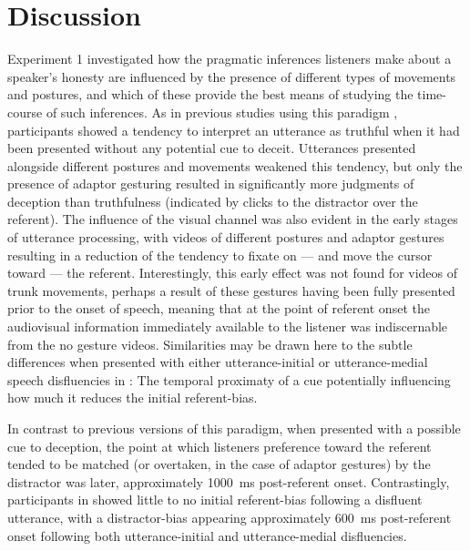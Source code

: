 \documentclass[a4paper,man,natbib]{apa6}
\begin{document}
\section{Discussion}
Experiment 1 investigated how the pragmatic inferences listeners make about a speaker's honesty are influenced by the presence of different types of movements and postures, and which of these provide the best means of studying the time-course of such inferences.
As in previous studies using this paradigm \citep{Loy2017, King2018}, participants showed a tendency to interpret an utterance as truthful when it had been presented without any potential cue to deceit.
Utterances presented alongside different postures and movements weakened this tendency, but only the presence of adaptor gesturing resulted in significantly more judgments of deception than truthfulness (indicated by clicks to the distractor over the referent).
The influence of the visual channel was also evident in the early stages of utterance processing, with videos of different postures and adaptor gestures resulting in a reduction of the tendency to fixate on --- and move the cursor toward --- the referent.
Interestingly, this early effect was not found for videos of trunk movements, perhaps a result of these gestures having been fully presented prior to the onset of speech, meaning that at the point of referent onset the audiovisual information immediately available to the listener was indiscernable from the no gesture videos. 
Similarities may be drawn here to the subtle differences when presented with either utterance-initial or utterance-medial speech disfluencies in \citet{Loy2017}: The temporal proximaty of a cue potentially influencing how much it reduces the initial referent-bias. 
 
In contrast to previous versions of this paradigm, when presented with a possible cue to deception, the point at which listeners preference toward the referent tended to be matched (or overtaken, in the case of adaptor gestures) by the distractor was later, approximately 1000~ms post-referent onset. 
Contrastingly, participants in \citeauthor{Loy2017} showed little to no initial referent-bias following a disfluent utterance, with a distractor-bias appearing approximately 600~ms post-referent onset following both utterance-initial and utterance-medial disfluencies. 
\end{document}
